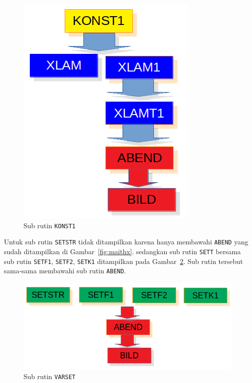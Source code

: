 \documentclass[a4paper,11pt]{report}
\renewcommand{\figurename}{Gambar}
\begin{document}
\begin{figure}[h!]
  \begin{center}
    \includegraphics[scale=.5]{../konst1.png}
    \caption{Sub rutin \texttt{KONST1}}
    \label{fig:konst1}
  \end{center}
\end{figure}

Untuk sub rutin \texttt{SETSTR} tidak ditampilkan karena hanya membawahi \texttt{ABEND} yang sudah ditampilkan di \figurename~\ref{fig:maithx}. sedangkan sub rutin \texttt{SETT} bersama sub rutin \texttt{SETF1}, \texttt{SETF2}, \texttt{SETK1} ditampilkan pada \figurename~\ref{fig:varset}. Sub rutin tersebut sama-sama membawahi sub rutin \texttt{ABEND}.

\begin{figure}[h!]
  \begin{center}
    \includegraphics[scale=.5]{../varSET.png}
    \caption{Sub rutin \texttt{VARSET}}
    \label{fig:varset}
  \end{center}
\end{figure}




%	
%	
\end{document}
